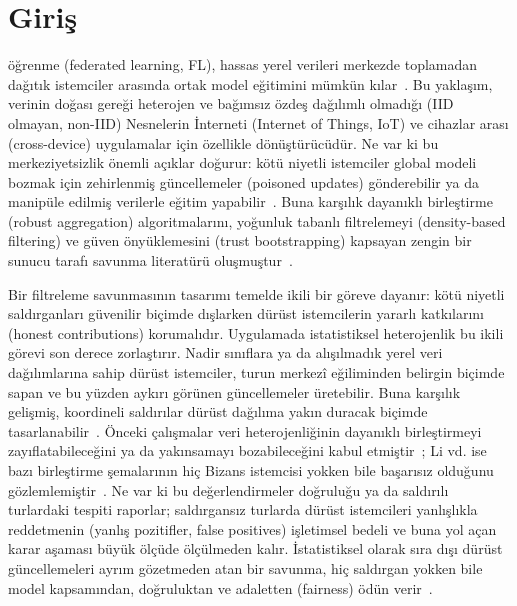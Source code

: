 \documentclass[journal]{IEEEtran}
\begin{document}
\section{Giriş}
 öğrenme (federated learning, FL), hassas yerel verileri merkezde toplamadan dağıtık istemciler arasında ortak model eğitimini mümkün kılar~\cite{mcmahan2017}. Bu yaklaşım, verinin doğası gereği heterojen ve bağımsız özdeş dağılımlı olmadığı (IID olmayan, non-IID) Nesnelerin İnterneti (Internet of Things, IoT) ve cihazlar arası (cross-device) uygulamalar için özellikle dönüştürücüdür. Ne var ki bu merkeziyetsizlik önemli açıklar doğurur: kötü niyetli istemciler global modeli bozmak için zehirlenmiş güncellemeler (poisoned updates) gönderebilir ya da manipüle edilmiş verilerle eğitim yapabilir~\cite{fang2020,bagdasaryan2020,xie2020dba}. Buna karşılık dayanıklı birleştirme (robust aggregation) algoritmalarını, yoğunluk tabanlı filtrelemeyi (density-based filtering) ve güven önyüklemesini (trust bootstrapping) kapsayan zengin bir sunucu tarafı savunma literatürü oluşmuştur~\cite{blanchard2017,nguyen2022flame,cao2021fltrust,miao2022privacy}.

Bir filtreleme savunmasının tasarımı temelde ikili bir göreve dayanır: kötü niyetli saldırganları güvenilir biçimde dışlarken dürüst istemcilerin yararlı katkılarını (honest contributions) korumalıdır. Uygulamada istatistiksel heterojenlik bu ikili görevi son derece zorlaştırır. Nadir sınıflara ya da alışılmadık yerel veri dağılımlarına sahip dürüst istemciler, turun merkezî eğiliminden belirgin biçimde sapan ve bu yüzden aykırı görünen güncellemeler üretebilir. Buna karşılık gelişmiş, koordineli saldırılar dürüst dağılıma yakın duracak biçimde tasarlanabilir~\cite{baruch2019,shejwalkar2021}. Önceki çalışmalar veri heterojenliğinin dayanıklı birleştirmeyi zayıflatabileceğini ya da yakınsamayı bozabileceğini kabul etmiştir~\cite{liu2023byzantine,li2025heterogeneity,ye2025illusion,bellachia2026sok}; Li vd. ise bazı birleştirme şemalarının hiç Bizans istemcisi yokken bile başarısız olduğunu gözlemlemiştir~\cite{li2024experimental}. Ne var ki bu değerlendirmeler doğruluğu ya da saldırılı turlardaki tespiti raporlar; saldırgansız turlarda dürüst istemcileri yanlışlıkla reddetmenin (yanlış pozitifler, false positives) işletimsel bedeli ve buna yol açan karar aşaması büyük ölçüde ölçülmeden kalır. İstatistiksel olarak sıra dışı dürüst güncellemeleri ayrım gözetmeden atan bir savunma, hiç saldırgan yokken bile model kapsamından, doğruluktan ve adaletten (fairness) ödün verir~\cite{singh2023fair,touat2023bias,ajibuwa2025fairness}.
\end{document}
